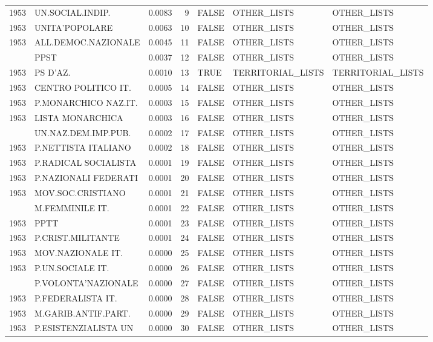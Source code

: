 \begin{longtable}[t]{rlrrlll}
1953 & UN.SOCIAL.INDIP. & 0.0083 & 9 & FALSE & OTHER\_LISTS & OTHER\_LISTS\\
1953 & UNITA'POPOLARE & 0.0063 & 10 & FALSE & OTHER\_LISTS & OTHER\_LISTS\\
1953 & ALL.DEMOC.NAZIONALE & 0.0045 & 11 & FALSE & OTHER\_LISTS & OTHER\_LISTS\\
\addlinespace
1953 & PPST & 0.0037 & 12 & FALSE & OTHER\_LISTS & OTHER\_LISTS\\
1953 & PS D'AZ. & 0.0010 & 13 & TRUE & TERRITORIAL\_LISTS & TERRITORIAL\_LISTS\\
1953 & CENTRO POLITICO IT. & 0.0005 & 14 & FALSE & OTHER\_LISTS & OTHER\_LISTS\\
1953 & P.MONARCHICO NAZ.IT. & 0.0003 & 15 & FALSE & OTHER\_LISTS & OTHER\_LISTS\\
1953 & LISTA MONARCHICA & 0.0003 & 16 & FALSE & OTHER\_LISTS & OTHER\_LISTS\\
\addlinespace
1953 & UN.NAZ.DEM.IMP.PUB. & 0.0002 & 17 & FALSE & OTHER\_LISTS & OTHER\_LISTS\\
1953 & P.NETTISTA ITALIANO & 0.0002 & 18 & FALSE & OTHER\_LISTS & OTHER\_LISTS\\
1953 & P.RADICAL SOCIALISTA & 0.0001 & 19 & FALSE & OTHER\_LISTS & OTHER\_LISTS\\
1953 & P.NAZIONALI FEDERATI & 0.0001 & 20 & FALSE & OTHER\_LISTS & OTHER\_LISTS\\
1953 & MOV.SOC.CRISTIANO & 0.0001 & 21 & FALSE & OTHER\_LISTS & OTHER\_LISTS\\
\addlinespace
1953 & M.FEMMINILE IT. & 0.0001 & 22 & FALSE & OTHER\_LISTS & OTHER\_LISTS\\
1953 & PPTT & 0.0001 & 23 & FALSE & OTHER\_LISTS & OTHER\_LISTS\\
1953 & P.CRIST.MILITANTE & 0.0001 & 24 & FALSE & OTHER\_LISTS & OTHER\_LISTS\\
1953 & MOV.NAZIONALE IT. & 0.0000 & 25 & FALSE & OTHER\_LISTS & OTHER\_LISTS\\
1953 & P.UN.SOCIALE IT. & 0.0000 & 26 & FALSE & OTHER\_LISTS & OTHER\_LISTS\\
\addlinespace
1953 & P.VOLONTA'NAZIONALE & 0.0000 & 27 & FALSE & OTHER\_LISTS & OTHER\_LISTS\\
1953 & P.FEDERALISTA IT. & 0.0000 & 28 & FALSE & OTHER\_LISTS & OTHER\_LISTS\\
1953 & M.GARIB.ANTIF.PART. & 0.0000 & 29 & FALSE & OTHER\_LISTS & OTHER\_LISTS\\
1953 & P.ESISTENZIALISTA UN & 0.0000 & 30 & FALSE & OTHER\_LISTS & OTHER\_LISTS\\

\end{longtable}
